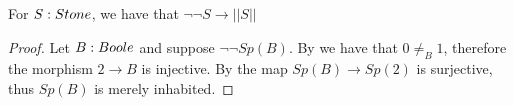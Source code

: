 \begin{corollary}\label{LemSurjectionsFormalToCompleteness}
 For $S:\Stone$, we have that $\neg \neg S \to || S ||$
\end{corollary}
\begin{proof}
  Let $B:\Boole$ and suppose $\neg \neg Sp(B)$. By  we have that $0\not=_B1$, therefore the morphism $2\to B$ is injective. By  the map $Sp(B) \to Sp(2)$ is surjective, thus $Sp(B)$ is merely inhabited. 
\end{proof} 




